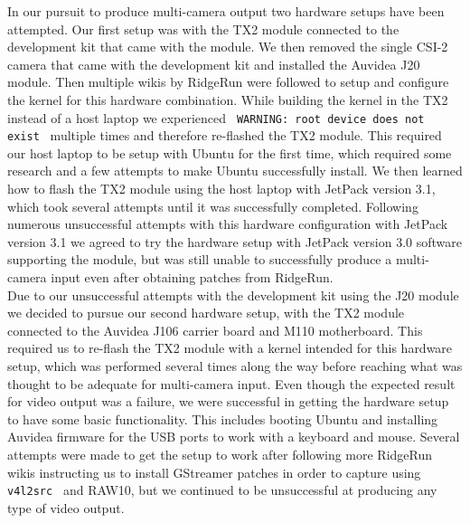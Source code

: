 \documentclass[letterpaper,10pt,serif,draftclsnofoot,onecolumn,compsoc,titlepage]{IEEEtran}
\begin{document}
In our pursuit to produce multi-camera output two hardware setups have been attempted. 
Our first 
setup was with the TX2 module connected to the development kit that came with the module. 
We then removed the single CSI-2 camera that came with the development kit and installed 
the Auvidea J20 module. Then multiple wikis by RidgeRun were followed to setup 
and configure 
the kernel for this hardware combination. While building the kernel in the TX2 instead of 
a host laptop we experienced \texttt{ WARNING: root device  does not exist } multiple times
and therefore re-flashed the TX2 module. This required our host laptop to be setup with 
Ubuntu for the first time, which required some research and a few attempts to make Ubuntu 
successfully install. We then learned how to flash the TX2 module using the host laptop 
with JetPack version 3.1, which took several attempts until it was successfully completed. 
Following numerous unsuccessful attempts with this hardware configuration with JetPack 
version 3.1 we agreed to try the hardware setup with JetPack version 3.0 software 
supporting the module, but was still unable to successfully produce a multi-camera input 
even after obtaining patches from RidgeRun. \\

Due to our unsuccessful attempts with the development kit using the J20 module we decided 
to pursue our second hardware setup, with the TX2 module 
connected to the Auvidea J106 carrier board and M110 motherboard. This required us to 
re-flash the TX2 module with a kernel intended for this hardware setup, which 
was performed several times along the way before reaching 
what was thought to be adequate for multi-camera input. Even though the expected result 
for video output was 
a failure, we were successful in getting the hardware setup to have some basic 
functionality. This includes booting Ubuntu and installing Auvidea firmware for the USB 
ports to work with a keyboard and mouse. Several attempts were made to get the setup to
work after following more RidgeRun wikis instructing us to install GStreamer patches 
in order to capture 
using \texttt{ v4l2src } and RAW10, but we continued to be unsuccessful at producing any type 
of video output. \\
\end{document}
